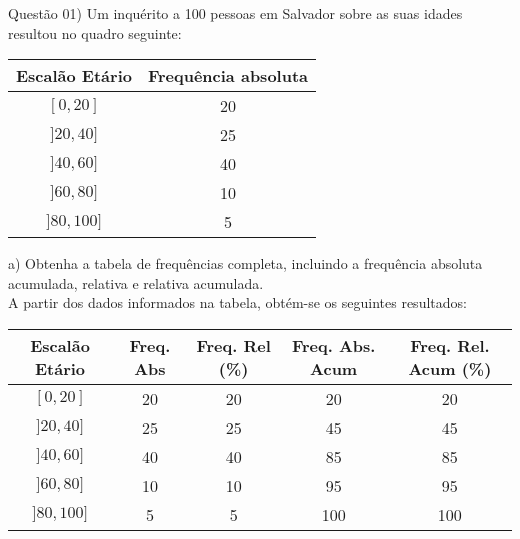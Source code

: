 
\noindent \textcolor{COLOR1}{Questão 01)} Um inquérito a 100 pessoas em Salvador sobre as suas idades resultou no quadro seguinte:
\\

\begin{table}[ht]
    \centering
    \begin{tabular}{c|c}
        \rowcolor{pagecolor!50!COLOR1}
        \hline
        Escalão Etário & Frequência absoluta \\ \hline\hline
        $[0,20]$       & 20                  \\\hline
        $]20,40]$      & 25                  \\\hline
        $]40,60]$      & 40                  \\\hline
        $]60,80]$      & 10                  \\\hline
        $]80,100]$     & 5                   \\\hline
    \end{tabular}
\end{table}

a) Obtenha a tabela de frequências completa, incluindo a frequência absoluta acumulada, relativa e relativa
acumulada.
\\

A partir dos dados informados na tabela, obtém-se os seguintes resultados:
\\

\begin{table}[ht]
    \centering
    \begin{tabular}{c|c|c|c|c}
        \rowcolor{pagecolor!50!COLOR1}
        \hline
        Escalão Etário & Freq. Abs & Freq. Rel (\%) & Freq. Abs. Acum & Freq. Rel. Acum (\%) \\ \hline\hline
        $[0,20]$       & 20        & 20             & 20              & 20                   \\\hline
        $]20,40]$      & 25        & 25             & 45              & 45                   \\\hline
        $]40,60]$      & 40        & 40             & 85              & 85                   \\\hline
        $]60,80]$      & 10        & 10             & 95              & 95                   \\\hline
        $]80,100]$     & 5         & 5              & 100             & 100                  \\\hline
    \end{tabular}
\end{table}


